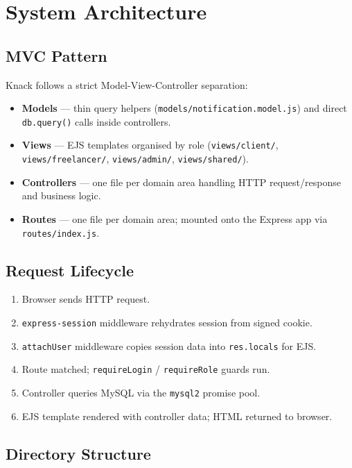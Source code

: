 \documentclass[12pt,a4paper]{article}
\begin{document}
\section{System Architecture}

\subsection{MVC Pattern}

Knack follows a strict Model-View-Controller separation:

\begin{itemize}[noitemsep]
  \item \textbf{Models} --- thin query helpers (\texttt{models/notification.model.js}) and direct \texttt{db.query()} calls inside controllers.
  \item \textbf{Views} --- EJS templates organised by role (\texttt{views/client/}, \texttt{views/freelancer/}, \texttt{views/admin/}, \texttt{views/shared/}).
  \item \textbf{Controllers} --- one file per domain area handling HTTP request/response and business logic.
  \item \textbf{Routes} --- one file per domain area; mounted onto the Express app via \texttt{routes/index.js}.
\end{itemize}

\subsection{Request Lifecycle}

\begin{enumerate}[noitemsep]
  \item Browser sends HTTP request.
  \item \texttt{express-session} middleware rehydrates session from signed cookie.
  \item \texttt{attachUser} middleware copies session data into \texttt{res.locals} for EJS.
  \item Route matched; \texttt{requireLogin} / \texttt{requireRole} guards run.
  \item Controller queries MySQL via the \texttt{mysql2} promise pool.
  \item EJS template rendered with controller data; HTML returned to browser.
\end{enumerate}

\subsection{Directory Structure}
\end{document}
